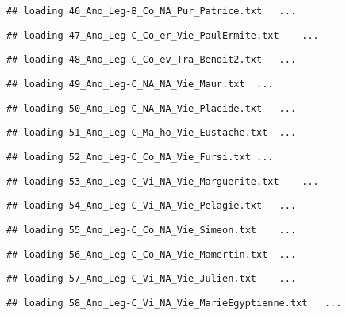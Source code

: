 \documentclass[]{article}
\begin{document}
\begin{verbatim}
## loading 46_Ano_Leg-B_Co_NA_Pur_Patrice.txt   ...
\end{verbatim}

\begin{verbatim}
## loading 47_Ano_Leg-C_Co_er_Vie_PaulErmite.txt    ...
\end{verbatim}

\begin{verbatim}
## loading 48_Ano_Leg-C_Co_ev_Tra_Benoit2.txt   ...
\end{verbatim}

\begin{verbatim}
## loading 49_Ano_Leg-C_NA_NA_Vie_Maur.txt  ...
\end{verbatim}

\begin{verbatim}
## loading 50_Ano_Leg-C_NA_NA_Vie_Placide.txt   ...
\end{verbatim}

\begin{verbatim}
## loading 51_Ano_Leg-C_Ma_ho_Vie_Eustache.txt  ...
\end{verbatim}

\begin{verbatim}
## loading 52_Ano_Leg-C_Co_NA_Vie_Fursi.txt ...
\end{verbatim}

\begin{verbatim}
## loading 53_Ano_Leg-C_Vi_NA_Vie_Marguerite.txt    ...
\end{verbatim}

\begin{verbatim}
## loading 54_Ano_Leg-C_Vi_NA_Vie_Pelagie.txt   ...
\end{verbatim}

\begin{verbatim}
## loading 55_Ano_Leg-C_Co_NA_Vie_Simeon.txt    ...
\end{verbatim}

\begin{verbatim}
## loading 56_Ano_Leg-C_Co_NA_Vie_Mamertin.txt  ...
\end{verbatim}

\begin{verbatim}
## loading 57_Ano_Leg-C_Vi_NA_Vie_Julien.txt    ...
\end{verbatim}

\begin{verbatim}
## loading 58_Ano_Leg-C_Vi_NA_Vie_MarieEgyptienne.txt   ...
\end{verbatim}
\end{document}

